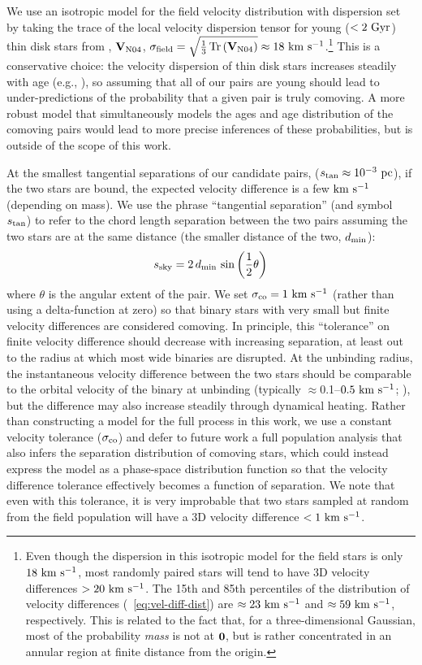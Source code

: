 \documentclass[modern, letterpaper]{aastex61}
\DeclareMathOperator{\Tr}{Tr}
\begin{document}
We use an isotropic model for the field velocity distribution with dispersion
set by taking the trace of the local velocity dispersion tensor for young
($<2~{\rm Gyr}$) thin disk stars from \citealt{Nordstrom:2004}, $\mathbf{V}_{\rm
N04}$, $\sigma_{\rm field} =
\sqrt{\frac{1}{3}\Tr{\left(\mat{V}_{\rm N04}\right)}} \approx
18~\kms$.\footnote{Even though the dispersion in this isotropic model for the
field stars is only $18~\mathrm{km}~\mathrm{s}^{-1}$, most randomly paired stars will tend to have 3D
velocity differences $>20~\mathrm{km}~\mathrm{s}^{-1}$.
The 15th and 85th percentiles of the distribution of velocity differences
(\eqname~\ref{eq:vel-diff-dist}) are $\approx 23~\mathrm{km}~\mathrm{s}^{-1}$ and $\approx 59~\mathrm{km}~\mathrm{s}^{-1}$,
respectively.
This is related to the fact that, for a three-dimensional Gaussian, most of the
probability \emph{mass} is not at $\boldsymbol{0}$, but is rather concentrated in an
annular region at finite distance from the origin.}
This is a conservative choice: the velocity dispersion of thin disk stars
increases steadily with age (e.g., \citealt{Aumer:2016}), so assuming that all
of our pairs are young should lead to under-predictions of the probability that
a given pair is truly comoving.
A more robust model that simultaneously models the ages and age distribution of
the comoving pairs would lead to more precise inferences of these probabilities,
but is outside of the scope of this work.

At the smallest tangential separations of our candidate pairs, ($s_{\rm tan}
\approx 10^{-3}~\mathrm{pc}$), if the two stars are bound, the expected velocity
difference is a few $\mathrm{km}~\mathrm{s}^{-1}$ (depending on mass).
We use the phrase ``tangential separation'' (and symbol $s_{\rm tan}$) to refer
to the chord length separation between the two pairs assuming the two stars are
at the same distance (the smaller distance of the two, $d_{\rm min}$):
\begin{equation}
    s_{\rm sky} = 2\, d_{\rm min} \, \sin{\left( \frac{1}{2}\theta \right)}
\end{equation}
where $\theta$ is the angular extent of the pair.
We set $\sigma_{\rm co} = 1~\mathrm{km}~\mathrm{s}^{-1}$ (rather than using a delta-function at zero)
so that binary stars with very small but finite velocity differences are
considered comoving.
In principle, this ``tolerance'' on finite velocity difference should decrease
with increasing separation, at least out to the radius at which most wide
binaries are disrupted.
At the unbinding radius, the instantaneous velocity difference between the two
stars should be comparable to the orbital velocity of the binary at unbinding
(typically $\approx$0.1--$0.5~\mathrm{km}~\mathrm{s}^{-1}$; \citealt{Jiang:2010}), but the difference
may also increase steadily through dynamical heating.
Rather than constructing a model for the full process in this work, we use a
constant velocity tolerance ($\sigma_{\rm co}$) and defer to future work a full
population analysis that also infers the separation distribution of comoving
stars, which could instead express the model as a phase-space distribution
function so that the velocity difference tolerance effectively becomes a
function of separation.
We note that even with this tolerance, it is very improbable that two stars
sampled at random from the field population will have a 3D velocity difference
$<1~\mathrm{km}~\mathrm{s}^{-1}$.
\end{document}
